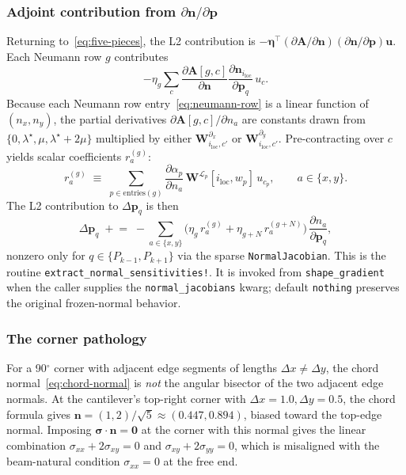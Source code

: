 \documentclass[11pt,a4paper]{article}
\newcommand{\mat}[1]{\mathbf{#1}}
\newcommand{\vect}[1]{\boldsymbol{#1}}
\newcommand{\pts}{\vect{p}}
\begin{document}
\subsubsection{Adjoint contribution from \texorpdfstring{$\partial\vect n/\partial\pts$}{dn/dp}}

Returning to~\eqref{eq:five-pieces}, the L2 contribution is
$- \vect\eta^\top (\partial\mat A/\partial\vect n)
   (\partial\vect n/\partial\pts) \vect u$. Each Neumann row $g$
contributes
\begin{equation}
  -\eta_g \sum_c
   \frac{\partial\mat A[g,c]}{\partial\vect n}
   \frac{\partial\vect n_{i_{\text{loc}}}}{\partial\pts_q}\,
   u_c.
\end{equation}
Because each Neumann row entry~\eqref{eq:neumann-row} is a linear
function of $(n_x, n_y)$, the partial derivatives
$\partial\mat A[g,c]/\partial n_a$ are constants drawn from
$\{0, \lambda^\star, \mu, \lambda^\star{+}2\mu\}$ multiplied by
either $\mat W^{\partial_x}_{i_{\text{loc}},c'}$ or
$\mat W^{\partial_y}_{i_{\text{loc}},c'}$. Pre-contracting over
$c$ yields scalar coefficients $r^{(g)}_a$:
\begin{equation}
  r^{(g)}_a
  \;\equiv\;
  \sum_{p \in \text{entries}(g)}
    \frac{\partial \alpha_p}{\partial n_a}\,
    \mat W^{\mathcal L_p}[i_{\text{loc}}, w_p]\, u_{c_p},
  \qquad a \in \{x, y\}.
  \label{eq:row-contraction}
\end{equation}
The L2 contribution to $\Delta\pts_q$ is then
\begin{equation}
  \boxed{\;
  \Delta\pts_q \;\mathrel{+}=\;
  -\!\!\!\sum_{a \in \{x,y\}}
   \big(\eta_g\, r^{(g)}_a + \eta_{g+N}\, r^{(g+N)}_a\big)\,
   \frac{\partial n_a}{\partial \pts_q},
   \;}
  \label{eq:l2-distribute}
\end{equation}
nonzero only for $q \in \{P_{k-1}, P_{k+1}\}$ via the sparse
\texttt{NormalJacobian}. This is the routine
\texttt{extract\_normal\_sensitivities!}. It is invoked from
\texttt{shape\_gradient} when the caller supplies the
\texttt{normal\_jacobians} kwarg; default \texttt{nothing}
preserves the original frozen-normal behavior.

\subsubsection{The corner pathology}
\label{sec:corner-fix}

For a 90$^\circ$ corner with adjacent edge segments of lengths
$\Delta x \ne \Delta y$, the chord normal~\eqref{eq:chord-normal}
is \emph{not} the angular bisector of the two adjacent edge
normals. At the cantilever's top-right corner with
$\Delta x = 1.0, \Delta y = 0.5$, the chord formula gives
$\vect n = (1, 2)/\sqrt 5 \approx (0.447, 0.894)$, biased toward
the top-edge normal. Imposing $\vect\sigma\!\cdot\!\vect n = \vect 0$
at the corner with this normal gives the linear combination
$\sigma_{xx} + 2\sigma_{xy} = 0$ and $\sigma_{xy} + 2\sigma_{yy} = 0$,
which is misaligned with the beam-natural condition
$\sigma_{xx} = 0$ at the free end.
\end{document}
